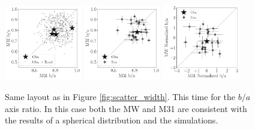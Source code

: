\documentclass[a4paper,fleqn,usenatbib]{mnras}
\begin{document}
\begin{figure}
\centering
\includegraphics[width=0.30\textwidth]{scatter_random_ranked_ba_ratio.pdf}
\includegraphics[width=0.30\textwidth]{scatter_ranked_illudm_ba_ratio.pdf}
\includegraphics[width=0.30\textwidth]{scatter_norm_ranked_illudm_ba_ratio.pdf}
\caption{Same layout as in Figure \ref{fig:scatter_width}. 
This time for the $b/a$ axis ratio. In this case both the MW and M31
are consistent with the results of a spherical distribution and the
simulations. 
\label{fig:scatter_ba_ratio}}
\end{figure}
\end{document}
